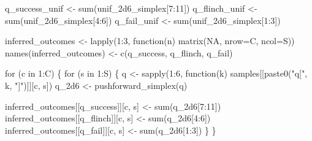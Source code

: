 \documentclass[
  letterpaper,
  DIV=11,
  numbers=noendperiod]{scrartcl}
\newenvironment{Shaded}{\begin{snugshade}}{\end{snugshade}}
\newcommand{\AttributeTok}[1]{\textcolor[rgb]{0.40,0.45,0.13}{#1}}
\newcommand{\ConstantTok}[1]{\textcolor[rgb]{0.56,0.35,0.01}{#1}}
\newcommand{\ControlFlowTok}[1]{\textcolor[rgb]{0.00,0.23,0.31}{#1}}
\newcommand{\DecValTok}[1]{\textcolor[rgb]{0.68,0.00,0.00}{#1}}
\newcommand{\FunctionTok}[1]{\textcolor[rgb]{0.28,0.35,0.67}{#1}}
\newcommand{\NormalTok}[1]{\textcolor[rgb]{0.00,0.23,0.31}{#1}}
\newcommand{\OtherTok}[1]{\textcolor[rgb]{0.00,0.23,0.31}{#1}}
\newcommand{\SpecialCharTok}[1]{\textcolor[rgb]{0.37,0.37,0.37}{#1}}
\newcommand{\StringTok}[1]{\textcolor[rgb]{0.13,0.47,0.30}{#1}}
\begin{document}
\begin{Shaded}
\begin{Highlighting}[]
\NormalTok{q\_success\_unif }\OtherTok{\textless{}{-}} \FunctionTok{sum}\NormalTok{(unif\_2d6\_simplex[}\DecValTok{7}\SpecialCharTok{:}\DecValTok{11}\NormalTok{])}
\NormalTok{q\_flinch\_unif }\OtherTok{\textless{}{-}} \FunctionTok{sum}\NormalTok{(unif\_2d6\_simplex[}\DecValTok{4}\SpecialCharTok{:}\DecValTok{6}\NormalTok{])}
\NormalTok{q\_fail\_unif }\OtherTok{\textless{}{-}} \FunctionTok{sum}\NormalTok{(unif\_2d6\_simplex[}\DecValTok{1}\SpecialCharTok{:}\DecValTok{3}\NormalTok{])}
\end{Highlighting}
\end{Shaded}

\begin{Shaded}
\begin{Highlighting}[]
\NormalTok{inferred\_outcomes }\OtherTok{\textless{}{-}} \FunctionTok{lapply}\NormalTok{(}\DecValTok{1}\SpecialCharTok{:}\DecValTok{3}\NormalTok{, }\ControlFlowTok{function}\NormalTok{(n) }\FunctionTok{matrix}\NormalTok{(}\ConstantTok{NA}\NormalTok{, }\AttributeTok{nrow=}\NormalTok{C, }\AttributeTok{ncol=}\NormalTok{S))}
\FunctionTok{names}\NormalTok{(inferred\_outcomes) }\OtherTok{\textless{}{-}} \FunctionTok{c}\NormalTok{(}\StringTok{\textquotesingle{}q\_success\textquotesingle{}}\NormalTok{, }\StringTok{\textquotesingle{}q\_flinch\textquotesingle{}}\NormalTok{, }\StringTok{\textquotesingle{}q\_fail\textquotesingle{}}\NormalTok{)}

\ControlFlowTok{for}\NormalTok{ (c }\ControlFlowTok{in} \DecValTok{1}\SpecialCharTok{:}\NormalTok{C) \{}
  \ControlFlowTok{for}\NormalTok{ (s }\ControlFlowTok{in} \DecValTok{1}\SpecialCharTok{:}\NormalTok{S) \{}
\NormalTok{    q }\OtherTok{\textless{}{-}} \FunctionTok{sapply}\NormalTok{(}\DecValTok{1}\SpecialCharTok{:}\DecValTok{6}\NormalTok{, }\ControlFlowTok{function}\NormalTok{(k)}
\NormalTok{      samples[[}\FunctionTok{paste0}\NormalTok{(}\StringTok{"q["}\NormalTok{, k, }\StringTok{"]"}\NormalTok{)]][c, s])}
\NormalTok{    q\_2d6 }\OtherTok{\textless{}{-}} \FunctionTok{pushforward\_simplex}\NormalTok{(q)}

\NormalTok{    inferred\_outcomes[[}\StringTok{\textquotesingle{}q\_success\textquotesingle{}}\NormalTok{]][c, s] }\OtherTok{\textless{}{-}} \FunctionTok{sum}\NormalTok{(q\_2d6[}\DecValTok{7}\SpecialCharTok{:}\DecValTok{11}\NormalTok{])}
\NormalTok{    inferred\_outcomes[[}\StringTok{\textquotesingle{}q\_flinch\textquotesingle{}}\NormalTok{]][c, s] }\OtherTok{\textless{}{-}} \FunctionTok{sum}\NormalTok{(q\_2d6[}\DecValTok{4}\SpecialCharTok{:}\DecValTok{6}\NormalTok{])}
\NormalTok{    inferred\_outcomes[[}\StringTok{\textquotesingle{}q\_fail\textquotesingle{}}\NormalTok{]][c, s] }\OtherTok{\textless{}{-}} \FunctionTok{sum}\NormalTok{(q\_2d6[}\DecValTok{1}\SpecialCharTok{:}\DecValTok{3}\NormalTok{])}
\NormalTok{  \}}
\NormalTok{\}}
\end{Highlighting}
\end{Shaded}
\end{document}
